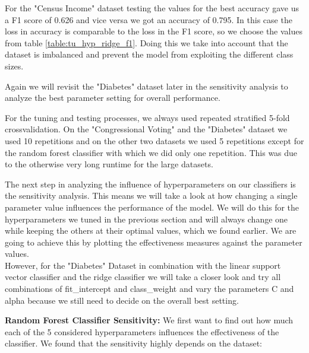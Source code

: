 \documentclass[a4paper,10pt]{article}
\begin{document}
For the "Census Income" dataset testing the values for the best accuracy gave us a F1 score of 0.626 and vice versa we got an accuracy of 0.795. In this case the loss in accuracy is comparable to the loss in the F1 score, so we choose the values from table \ref{table:tu_hyp_ridge_f1}. Doing this we take into account that the dataset is imbalanced and prevent the model from exploiting the different class sizes.

Again we will revisit the "Diabetes" dataset later in the sensitivity analysis to analyze the best parameter setting for overall performance.


For the tuning and testing processes, we always used repeated stratified 5-fold crossvalidation. On the "Congressional Voting" and the "Diabetes" dataset we used 10 repetitions and on the other two datasets we used 5 repetitions except for the random forest classifier with which we did only one repetition. This was due to the otherwise very long runtime for the large datasets.

The next step in analyzing the influence of hyperparameters on our classifiers is the sensitivity analysis. This means we will take a look at how changing a single parameter value influences the performance of the model. We will do this for the hyperparameters we tuned in the previous section and will always change one while keeping the others at their optimal values, which we found earlier. We are going to achieve this by plotting the effectiveness measures against the parameter values.\\
However, for the "Diabetes" Dataset in combination with the linear support vector classifier and the ridge classifier we will take a closer look and try all combinations of \textsf{fit\_intercept} and \textsf{class\_weight} and vary the parameters \textsf{C} and \textsf{alpha} because we still need to decide on the overall best setting.

\textbf{Random Forest Classifier Sensitivity:}
We first want to find out how much each of the 5 considered hyperparameters influences the effectiveness of the classifier. We found that the sensitivity highly depends on the dataset:
\end{document}
